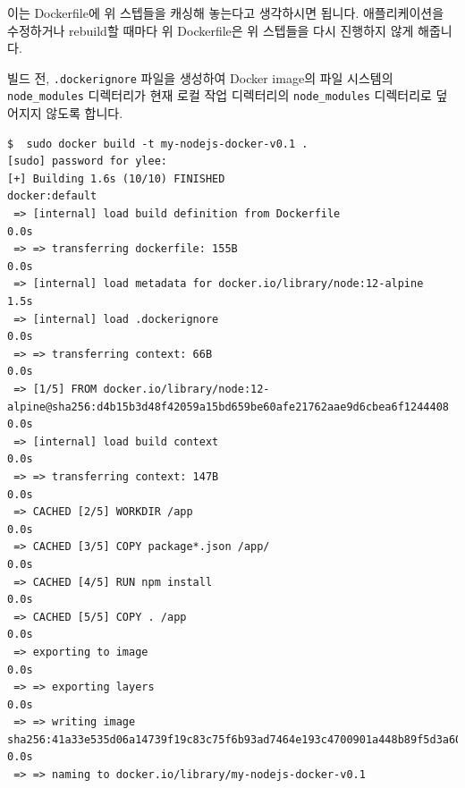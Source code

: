\documentclass{article}
\begin{document}
이는 Dockerfile에 위 스텝들을 캐싱해 놓는다고 생각하시면 됩니다. 애플리케이션을 수정하거나 rebuild할 때마다 위 Dockerfile은 위 스텝들을 다시 진행하지 않게 해줍니다.

빌드 전, \texttt{.dockerignore} 파일을 생성하여 Docker image의 파일 시스템의 \texttt{node\_modules} 디렉터리가 현재 로컬 작업 디렉터리의 \texttt{node\_modules} 디렉터리로 덮어지지 않도록 합니다.

\begin{lstlisting}[language=Shell, caption={Docker 이미지 빌드}]
  $  sudo docker build -t my-nodejs-docker-v0.1 .
[sudo] password for ylee: 
[+] Building 1.6s (10/10) FINISHED                                                                    docker:default
 => [internal] load build definition from Dockerfile                                                            0.0s
 => => transferring dockerfile: 155B                                                                            0.0s
 => [internal] load metadata for docker.io/library/node:12-alpine                                               1.5s
 => [internal] load .dockerignore                                                                               0.0s
 => => transferring context: 66B                                                                                0.0s
 => [1/5] FROM docker.io/library/node:12-alpine@sha256:d4b15b3d48f42059a15bd659be60afe21762aae9d6cbea6f1244408  0.0s
 => [internal] load build context                                                                               0.0s
 => => transferring context: 147B                                                                               0.0s
 => CACHED [2/5] WORKDIR /app                                                                                   0.0s
 => CACHED [3/5] COPY package*.json /app/                                                                       0.0s
 => CACHED [4/5] RUN npm install                                                                                0.0s
 => CACHED [5/5] COPY . /app                                                                                    0.0s
 => exporting to image                                                                                          0.0s
 => => exporting layers                                                                                         0.0s
 => => writing image sha256:41a33e535d06a14739f19c83c75f6b93ad7464e193c4700901a448b89f5d3a60                    0.0s
 => => naming to docker.io/library/my-nodejs-docker-v0.1  
\end{lstlisting}
\end{document}
